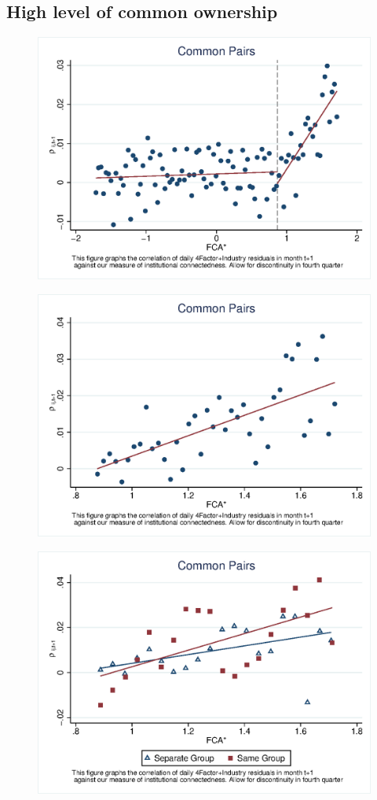 \documentclass[12pt, a4paper]{article}
\begin{document}
\FloatBarrier










\subsection{High level of common ownership}

 \begin{figure}[htbp]
 \centering  
\includegraphics[width=0.6\linewidth]{"Qmcorr5lrd.eps"}
\end{figure}

 \begin{figure}[htbp]
	\centering  
	\includegraphics[width=0.6\linewidth]{"Qmcorr5subsample.eps"}
\end{figure}

 \begin{figure}[htbp]
	\centering  
	\includegraphics[width=0.6\linewidth]{"Qmcorr5lrdbgsubsample.eps"}
\end{figure}
\end{document}
